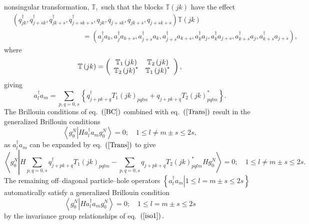 \documentclass[aps,preprint]{revtex4}%
\begin{document}
nonsingular transformation, $\mathbb{T},$ such that the blocks $\mathbb{T}%
\left(  jk\right)  $ have the effect
\begin{align}
&  \left(  q_{jk}^{\dagger},q_{j+sk}^{\dagger},q_{jk+s}^{\dagger}%
,q_{j+sk+s}^{\dagger},q_{jk},q_{j+sk},q_{jk+s},q_{j+sk+s}\right)
\mathbb{T}\left(  jk\right) \nonumber\\
&  \qquad\qquad\qquad\qquad\qquad\left.  =\right.  \left(  a_{j}^{\dagger
}a_{k},a_{j}^{\dagger}a_{k+s},a_{j+s}^{\dagger}a_{k},a_{j+s}^{\dagger}%
a_{k+s},a_{k}^{\dagger}a_{j},a_{k}^{\dagger}a_{j+s},a_{k+s}^{\dagger}%
a_{j},a_{k+s}^{\dagger}a_{j+s}\right)  ,
\end{align}
where
\begin{equation}
\mathbb{T}\left(  jk\right)  =\left(
\begin{array}
[c]{cc}%
\mathbb{T}_{1}\left(  jk\right)  & \mathbb{T}_{2}\left(  jk\right) \\
\mathbb{T}_{2}\left(  jk\right)  ^{\ast} & \mathbb{T}_{1}\left(  jk\right)
^{\ast}%
\end{array}
\right)  ,
\end{equation}
giving
\begin{equation}
a_{l}^{\dagger}a_{m}=\sum_{p,q=0,s}\left\{  q_{j+pk+q}^{\dagger}T_{1}\left(
jk\right)  _{pqlm}+q_{j+pk+q}T_{2}\left(  jk\right)  _{pqlm}^{\ast}\right\}  .
\label{Trans}%
\end{equation}
The Brillouin conditions of eq.\ $\left(  \ref{BC}\right)  $ combined with
eq.\ $\left(  \ref{Trans}\right)  $ result in the generalized Brillouin
conditions
\begin{equation}
\left\langle g_{0}^{N}\left\vert Ha_{l}^{\dagger}a_{m}\right.  g_{0}%
^{N}\right\rangle =0;\quad1\leq l\neq m\pm s\leq2s, \label{GBC}%
\end{equation}
as $a_{l}^{\dagger}a_{m}$ can be expanded by eq.\ $\left(  \ref{Trans}\right)
$ to give%
\begin{equation}
\left\langle g_{0}^{N}\left\vert H\sum_{p,q=0,s}q_{j+pk+q}^{\dagger}%
T_{1}\left(  jk\right)  _{pqlm}-\sum_{p,q=0,s}q_{j+pk+q}T_{2}\left(
jk\right)  _{pqlm}^{\ast}Hg_{0}^{N}\right.  \right\rangle =0;\quad1\leq l\neq
m\pm s\leq2s.
\end{equation}
The remaining off--diagonal particle--hole operators $\left\{  \left.
a_{l}^{\dagger}a_{m}\right\vert 1\leq l=m\pm s\leq2s\right\}  $ automatically
satisfy a generalized Brillouin condition
\begin{equation}
\left\langle g_{0}^{N}\left\vert Ha_{l}^{\dagger}a_{m}g_{0}^{N}\right.
\right\rangle =0;\quad1\leq l=m\pm s\leq2s \label{ph}%
\end{equation}
by the invariance group relationships of eq.\ $\left(  \ref{iso1}\right)  .$
\end{document}
